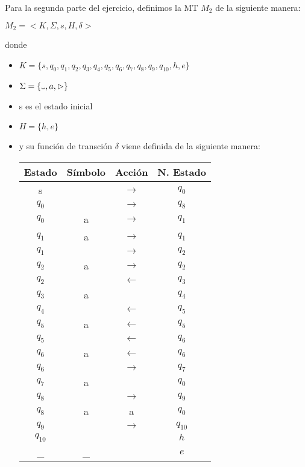 \documentclass[11pt, a4paper, titlepage]{article}
\newcommand\vartextvisiblespace[1][.5em]{%
  \makebox[#1]{%
    \kern.07em
    \vrule height.3ex
    \hrulefill
    \vrule height.3ex
    \kern.07em
  }%
}
\begin{document}
\hfill \break
Para la segunda parte del ejercicio, definimos la MT $M_2$ de la
siguiente manera:

$ M_2 = < K, \Sigma, s, H, \delta >$

donde

\begin{itemize}
\item $ K = \{ s, q_{0}, q_{1}, q_{2}, q_{3}, q_{4}, q_{5}, q_{6}, q_{7}, q_{8}, q_{9}, q_{10}, h, e \}$
\item $ \Sigma = \{\vartextvisiblespace, a, \rhd \}$
\item s es el estado inicial
\item $ H = \{ h, e \}$
\item y su función de transción $\delta$ viene definida de la siguiente manera:
  \begin{center}
    \begin{tabular}{|| c c c c ||}
      \hline
      Estado & Símbolo & Acción & N. Estado \\ [0.5ex]
      \hline\hline
      s & \vartextvisiblespace & $\rightarrow$ & $q_0$ \\
      \hline
      $q_0$ & \vartextvisiblespace & $\rightarrow$ & $q_8$ \\
      \hline
      $q_0$ & a & $\rightarrow$ & $q_1$ \\
      \hline
      $q_1$ & a & $\rightarrow$ & $q_1$ \\
      \hline
      $q_1$ & \vartextvisiblespace & $\rightarrow$ & $q_2$ \\
      \hline
      $q_2$ & a & $\rightarrow$ & $q_2$ \\
      \hline
      $q_2$ & \vartextvisiblespace & $\leftarrow$ &$q_3$ \\
      \hline
      $q_3$ & a & \vartextvisiblespace & $q_4$ \\
      \hline
      $q_4$ & \vartextvisiblespace & $\leftarrow$ & $q_5$ \\
      \hline
      $q_5$ & a & $\leftarrow$ & $q_5$ \\
      \hline
      $q_5$ & \vartextvisiblespace & $\leftarrow$ & $q_6$ \\
      \hline
      $q_6$ & a & $\leftarrow$ & $q_6$ \\
      \hline
      $q_6$ & \vartextvisiblespace & $\rightarrow$ & $q_7$ \\
      \hline
      $q_7$ & a & \vartextvisiblespace & $q_0$ \\
      \hline
      $q_8$ & \vartextvisiblespace & $\rightarrow$ & $q_9$ \\
      \hline
      $q_8$ & a & a & $q_0$ \\
      \hline
      $q_9$ & \vartextvisiblespace & $\rightarrow$ & $q_{10}$ \\
      \hline
      $q_{10}$ & \vartextvisiblespace & \vartextvisiblespace & $h$ \\
      \hline
      \_ & \_ & \vartextvisiblespace & $e$ \\
      \hline
    \end{tabular}
\end{center}
\end{itemize}
\end{document}
